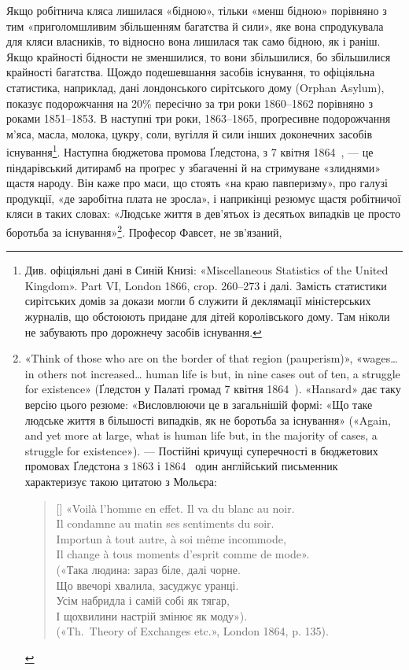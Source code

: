 Якщо робітнича кляса лишилася «бідною», тільки «менш
бідною» порівняно з тим «приголомшливим збільшенням багатства
й сили», яке вона спродукувала для кляси власників, то
відносно вона лишилася так само бідною, як і раніш. Якщо
крайності бідности не зменшилися, то вони збільшилися, бо
збільшилися крайності багатства. Щождо подешевшання засобів
існування, то офіціяльна статистика, наприклад, дані лондонського
сирітського дому (Orphan Asylum), показує подорожчання
на 20\% пересічно за три роки 1860--1862 порівняно з роками
1851--1853. В наступні три роки, 1863--1865, проґресивне
подорожчання м’яса, масла, молока, цукру, соли, вугілля й
сили інших доконечних засобів існування\footnote{
Див. офіціяльні дані в Синій Книзі: «Miscellaneous Statistics
of the United Kingdom». Part VI, London 1866, crop. 260--273 і далі.
Замість статистики сирітських домів за докази могли б служити й деклямації
міністерських журналів, що обстоюють придане для дітей королівського
дому. Там ніколи не забувають про дорожнечу засобів існування.
}. Наступна бюджетова
промова Ґледстона, з 7 квітня 1864~, — це піндарівський
дитирамб на проґрес у збагаченні й на стримуване «злиднями»
щастя народу. Він каже про маси, що стоять «на краю
павперизму», про галузі продукції, «де заробітна плата не
зросла», і наприкінці резюмує щастя робітничої кляси в таких
словах: «Людське життя в дев’ятьох із десятьох випадків це
просто боротьба за
існування»\footnote{\label{footnote-105}«Think of those who
are on the border of that region (pauperism)»,
«wages\dots{} in others not increased\dots{} human life is but, in nine cases out of ten,
a struggle for existence» (Ґледстон у Палаті громад 7 квітня 1864~).
«Hansard» дає таку версію цього резюме: «Висловлюючи це в загальнішій
формі: «Що таке людське життя в більшості випадків, як не боротьба
за існування» («Again, and yet more at large, what is human life but,
in the majority of cases, a struggle for existence»). — Постійні кричущі суперечності
в бюджетових промовах Ґледстона з 1863 і 1864~ один англійський
письменник характеризує такою цитатою з Мольєра:

\settowidth{\versewidth}{Il change à tous moments d’esprit comme de mode».}
\begin{verse}[\versewidth]
«Voilà l’homme en effet. Il va du blanc au noir. \\
Il condamne au matin ses sentiments du soir. \\
Importun à tout autre, à soi même incommode, \\
Il change à tous moments d’esprit comme de mode». \\
\smallskip
(«Така людина: зараз біле, далі чорне. \\
Що ввечорі хвалила, засуджує уранці. \\
Усім набридла і самій собі як тягар, \\
І щохвилини настрій змінює як моду»). \\
\smallskip
(«Th.~Theory of Exchanges etc.», London 1864, p. 135).
\end{verse}

}. Професор Фавсет, не зв’язаний,
